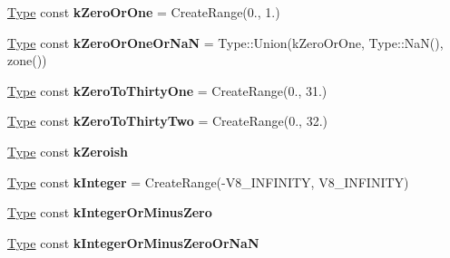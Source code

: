 \begin{DoxyCompactItemize}
\item 
\mbox{\label{classv8_1_1internal_1_1compiler_1_1TypeCache_a9184ff703a036a5ddb246a22dad23ff7}} 
\mbox{\hyperlink{classv8_1_1internal_1_1compiler_1_1Type}{Type}} const {\bfseries k\+Zero\+Or\+One} = Create\+Range(0., 1.)
\item 
\mbox{\label{classv8_1_1internal_1_1compiler_1_1TypeCache_a5c71c54fcc61f6c9a5a255d2869286c7}} 
\mbox{\hyperlink{classv8_1_1internal_1_1compiler_1_1Type}{Type}} const {\bfseries k\+Zero\+Or\+One\+Or\+NaN} = Type\+::\+Union(k\+Zero\+Or\+One, Type\+::\+NaN(), zone())
\item 
\mbox{\label{classv8_1_1internal_1_1compiler_1_1TypeCache_aa0b27da6ebf60a2b7913b66d8001f3e2}} 
\mbox{\hyperlink{classv8_1_1internal_1_1compiler_1_1Type}{Type}} const {\bfseries k\+Zero\+To\+Thirty\+One} = Create\+Range(0., 31.)
\item 
\mbox{\label{classv8_1_1internal_1_1compiler_1_1TypeCache_a24265e0a92e9bd1df6372511d0ad8aa0}} 
\mbox{\hyperlink{classv8_1_1internal_1_1compiler_1_1Type}{Type}} const {\bfseries k\+Zero\+To\+Thirty\+Two} = Create\+Range(0., 32.)
\item 
\mbox{\hyperlink{classv8_1_1internal_1_1compiler_1_1Type}{Type}} const {\bfseries k\+Zeroish}
\item 
\mbox{\label{classv8_1_1internal_1_1compiler_1_1TypeCache_a703d29a37846ea5fc4b1fa2cc9be82a6}} 
\mbox{\hyperlink{classv8_1_1internal_1_1compiler_1_1Type}{Type}} const {\bfseries k\+Integer} = Create\+Range(-\/V8\+\_\+\+I\+N\+F\+I\+N\+I\+TY, V8\+\_\+\+I\+N\+F\+I\+N\+I\+TY)
\item 
\mbox{\hyperlink{classv8_1_1internal_1_1compiler_1_1Type}{Type}} const {\bfseries k\+Integer\+Or\+Minus\+Zero}
\item 
\mbox{\hyperlink{classv8_1_1internal_1_1compiler_1_1Type}{Type}} const {\bfseries k\+Integer\+Or\+Minus\+Zero\+Or\+NaN}
\item 
\mbox{\label{classv8_1_1internal_1_1compiler_1_1TypeCache_a883f27623716a77bcf9442104188ee1d}} 

\end{DoxyCompactItemize}
